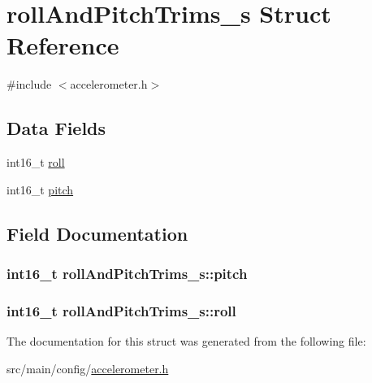\hypertarget{structrollAndPitchTrims__s}{\section{roll\+And\+Pitch\+Trims\+\_\+s Struct Reference}
\label{structrollAndPitchTrims__s}
}


{\ttfamily \#include $<$accelerometer.\+h$>$}

\subsection*{Data Fields}
\begin{DoxyCompactItemize}
\item 
int16\+\_\+t \hyperlink{structrollAndPitchTrims__s_a0b139f9ea1cac670c770106785c9f8c8}{roll}
\item 
int16\+\_\+t \hyperlink{structrollAndPitchTrims__s_a877ed9e3fc82c344d9df9214f02ea15f}{pitch}
\end{DoxyCompactItemize}


\subsection{Field Documentation}
\hypertarget{structrollAndPitchTrims__s_a877ed9e3fc82c344d9df9214f02ea15f}{
\subsubsection[{pitch}]{\setlength{\rightskip}{0pt plus 5cm}int16\+\_\+t roll\+And\+Pitch\+Trims\+\_\+s\+::pitch}}\label{structrollAndPitchTrims__s_a877ed9e3fc82c344d9df9214f02ea15f}
\hypertarget{structrollAndPitchTrims__s_a0b139f9ea1cac670c770106785c9f8c8}{
\subsubsection[{roll}]{\setlength{\rightskip}{0pt plus 5cm}int16\+\_\+t roll\+And\+Pitch\+Trims\+\_\+s\+::roll}}\label{structrollAndPitchTrims__s_a0b139f9ea1cac670c770106785c9f8c8}


The documentation for this struct was generated from the following file\+:\begin{DoxyCompactItemize}
\item 
src/main/config/\hyperlink{accelerometer_8h}{accelerometer.\+h}\end{DoxyCompactItemize}
